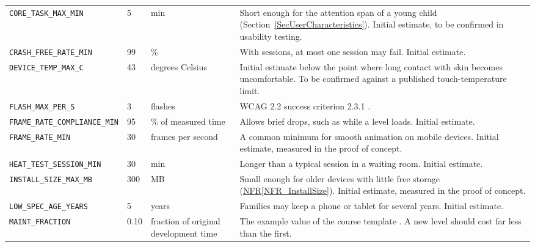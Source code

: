 \documentclass[10pt]{article}
\newcommand{\nfrref}[1]{\hyperref[#1]{NFR\ref*{#1}}}
\newcommand{\constref}[1]{%
    \hyperref[const:#1]{\texttt{\detokenize{#1}}}%
}
\begin{document}
\begin{longtable}{>{\raggedright\arraybackslash}p{} p{} >{\raggedright\arraybackslash}p{} >{\raggedright\arraybackslash}p{}}
\texttt{CORE\_TASK\_MAX\_MIN}
\label{const:CORE_TASK_MAX_MIN}
& 5 & min & Short enough for the attention span of a young child (Section~\ref{SecUserCharacteristics}). Initial estimate, to be confirmed in usability testing. \\

\texttt{CRASH\_FREE\_RATE\_MIN}
\label{const:CRASH_FREE_RATE_MIN}
& 99 & \% & With \constref{TEST_SESSIONS_MIN} sessions, at most one session may fail. Initial estimate. \\

\texttt{DEVICE\_TEMP\_MAX\_C}
\label{const:DEVICE_TEMP_MAX_C}
& 43 & degrees Celsius & Initial estimate below the point where long contact with skin becomes uncomfortable. To be confirmed against a published touch-temperature limit. \\

\texttt{FLASH\_MAX\_PER\_S}
\label{const:FLASH_MAX_PER_S}
& 3 & flashes & WCAG 2.2 success criterion 2.3.1 \cite{WCAG22}. \\

\texttt{FRAME\_RATE\_COMPLIANCE\_MIN}
\label{const:FRAME_RATE_COMPLIANCE_MIN}
& 95 & \% of measured time & Allows brief drops, such as while a level loads. Initial estimate. \\

\texttt{FRAME\_RATE\_MIN}
\label{const:FRAME_RATE_MIN}
& 30 & frames per second & A common minimum for smooth animation on mobile devices. Initial estimate, measured in the proof of concept. \\

\texttt{HEAT\_TEST\_SESSION\_MIN}
\label{const:HEAT_TEST_SESSION_MIN}
& 30 & min & Longer than a typical session in a waiting room. Initial estimate. \\

\texttt{INSTALL\_SIZE\_MAX\_MB}
\label{const:INSTALL_SIZE_MAX_MB}
& 300 & MB & Small enough for older devices with little free storage (\nfrref{NFR_InstallSize}). Initial estimate, measured in the proof of concept. \\

\texttt{LOW\_SPEC\_AGE\_YEARS}
\label{const:LOW_SPEC_AGE_YEARS}
& 5 & years & Families may keep a phone or tablet for several years. Initial estimate. \\

\texttt{MAINT\_FRACTION}
\label{const:MAINT_FRACTION}
& 0.10 & fraction of original development time & The example value of the course template \cite{SmithCapTemplate}. A new level should cost far less than the first. \\


\end{longtable}
\end{document}
